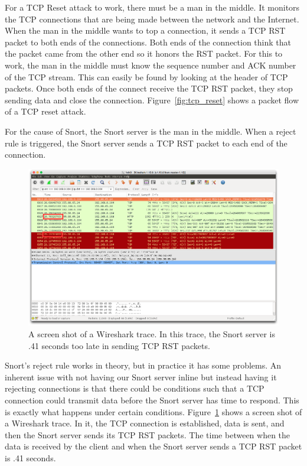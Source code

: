 For a TCP Reset attack to work, there must be a man in the middle. It monitors
the TCP connections that are being made between the network and the Internet.
When the man in the middle wants to top a connection, it sends a TCP RST packet
to both ends of the connections. Both ends of the connection think that the
packet came from the other end so it honors the RST packet. For this to work,
the man in the middle must know the sequence number and ACK number of the TCP
stream. This can easily be found by looking at the header of TCP packets. Once
both ends of the connect receive the TCP RST packet, they stop sending data and
close the connection. Figure~\ref{fig:tcp_reset} shows a packet flow of a TCP
reset attack.

For the cause of Snort, the Snort server is the man in the middle. When a
reject rule is triggered, the Snort server sends a TCP RST packet to each end
of the connection.

\begin{figure}[!t]
    \centering
    \includegraphics[width=\columnwidth]{figures/snort_slow}
    \caption{A screen shot of a Wireshark trace. In this trace, the Snort
    server is .41 seconds too late in sending TCP RST packets.}
    \label{fig:snort_slow}
\end{figure}

Snort's reject rule works in theory, but in practice it has some problems. 
%
An inherent issue with not having our Snort server inline but instead having
it rejecting connections is that there could be conditions such that a TCP
connection could transmit data  before the Snort server has time to respond.
%
This is exactly what happens under certain conditions.
%
Figure~\ref{fig:snort_slow} shows a screen shot of a Wireshark trace.
%
In it, the TCP connection is established, data is sent, and then the Snort
server sends its TCP RST packets.
%
The time between when the data is received by the client and when the Snort
server sends a TCP RST packet is .41 seconds.

